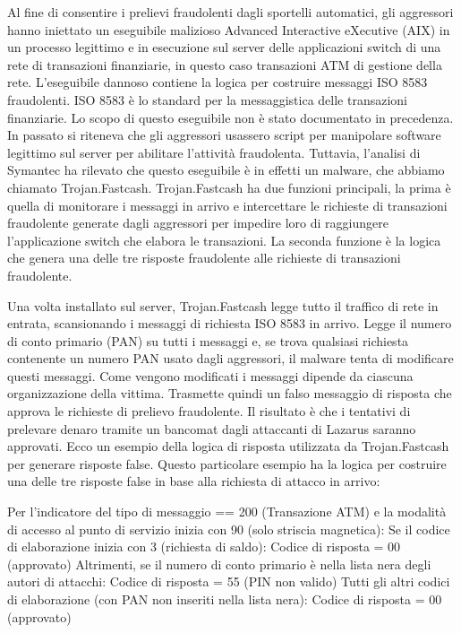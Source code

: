 \documentclass[10pt,a4paper, titlepage]{report}
\begin{document}
Al fine di consentire i prelievi fraudolenti dagli sportelli automatici, gli aggressori hanno iniettato un eseguibile malizioso Advanced Interactive eXecutive (AIX) in un processo legittimo e in esecuzione sul server delle applicazioni switch di una rete di transazioni finanziarie, in questo caso transazioni ATM di gestione della rete. L'eseguibile dannoso contiene la logica per costruire messaggi ISO 8583 fraudolenti. ISO 8583 è lo standard per la messaggistica delle transazioni finanziarie. Lo scopo di questo eseguibile non è stato documentato in precedenza. In passato si riteneva che gli aggressori usassero script per manipolare software legittimo sul server per abilitare l'attività fraudolenta. 
Tuttavia, l'analisi di Symantec ha rilevato che questo eseguibile è in effetti un malware, che abbiamo chiamato Trojan.Fastcash.  
Trojan.Fastcash ha due funzioni principali, la prima è quella di monitorare i messaggi in arrivo e intercettare le richieste di transazioni fraudolente generate dagli aggressori per impedire loro di raggiungere l'applicazione switch che elabora le transazioni. La seconda funzione è la logica che genera una delle tre risposte fraudolente alle richieste di transazioni fraudolente. 

Una volta installato sul server, Trojan.Fastcash legge tutto il traffico di rete in entrata, scansionando i messaggi di richiesta ISO 8583 in arrivo. Legge il numero di conto primario (PAN) su tutti i messaggi e, se trova qualsiasi richiesta contenente un numero PAN usato dagli aggressori, il malware tenta di modificare questi messaggi. Come vengono modificati i messaggi dipende da ciascuna organizzazione della vittima. Trasmette quindi un falso messaggio di risposta che approva le richieste di prelievo fraudolente. Il risultato è che i tentativi di prelevare denaro tramite un bancomat dagli attaccanti di Lazarus saranno approvati. 
Ecco un esempio della logica di risposta utilizzata da Trojan.Fastcash per generare risposte false. Questo particolare esempio ha la logica per costruire una delle tre risposte false in base alla richiesta di attacco in arrivo: 
 
Per l'indicatore del tipo di messaggio == 200 (Transazione ATM) e la modalità di accesso al punto di servizio inizia con 90 (solo striscia magnetica): 
Se il codice di elaborazione inizia con 3 (richiesta di saldo): 
Codice di risposta = 00 (approvato) 
Altrimenti, se il numero di conto primario è nella lista nera degli autori di attacchi: 
Codice di risposta = 55 (PIN non valido) 
Tutti gli altri codici di elaborazione (con PAN non inseriti nella lista nera): 
Codice di risposta = 00 (approvato) 
 
\end{document}

